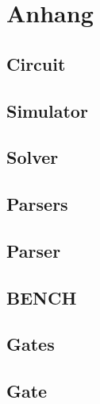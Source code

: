 \chapter{Anhang}
\section{Circuit}
\label{lst:circuit}


\section{Simulator}
\label{lst:simulator}


\section{Solver}
\label{lst:solver}


\section{Parsers}
\label{lst:parsers}


\section{Parser}
\label{lst:parser}


\section{BENCH}
\label{lst:bench}


\section{Gates}
\label{lst:gates}


\section{Gate}
\label{lst:gate}


